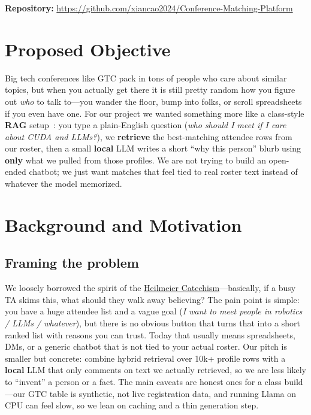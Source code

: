 \documentclass[paper=a4, fontsize=11pt]{scrartcl}
\title{\assignment}
\date{\duedate}
\author{%
  \textbf{Xian Cao, Xueming Tang, Chenyang Li} \\
  \href{https://github.com/xiancao2024/Conference-Matching-Platform}{GitHub repository} (add LDAP/e-mails per course instructions)
}
\begin{document}
\maketitle

\noindent\textbf{Repository:} \url{https://github.com/xiancao2024/Conference-Matching-Platform}

\section{Proposed Objective}

Big tech conferences like GTC pack in tons of people who care about similar topics, but when you actually get there it is still pretty random how you figure out \emph{who} to talk to---you wander the floor, bump into folks, or scroll spreadsheets if you even have one. For our project we wanted something more like a class-style \textbf{RAG} setup~\cite{lewis2020retrieval}: you type a plain-English question (\emph{who should I meet if I care about CUDA and LLMs?}), we \textbf{retrieve} the best-matching attendee rows from our roster, then a small \textbf{local} LLM writes a short ``why this person'' blurb using \textbf{only} what we pulled from those profiles. We are not trying to build an open-ended chatbot; we just want matches that feel tied to real roster text instead of whatever the model memorized.

\section{Background and Motivation}

\subsection*{Framing the problem}

We loosely borrowed the spirit of the \href{https://www.darpa.mil/work-with-us/heilmeier-catechism}{Heilmeier Catechism}---basically, if a busy TA skims this, what should they walk away believing? The pain point is simple: you have a huge attendee list and a vague goal (\emph{I want to meet people in robotics / LLMs / whatever}), but there is no obvious button that turns that into a short ranked list with reasons you can trust. Today that usually means spreadsheets, DMs, or a generic chatbot that is not tied to your actual roster. Our pitch is smaller but concrete: combine hybrid retrieval over 10k+ profile rows with a \textbf{local} LLM that only comments on text we actually retrieved, so we are less likely to ``invent'' a person or a fact. The main caveats are honest ones for a class build---our GTC table is synthetic, not live registration data, and running Llama on CPU can feel slow, so we lean on caching and a thin generation step.
\end{document}
